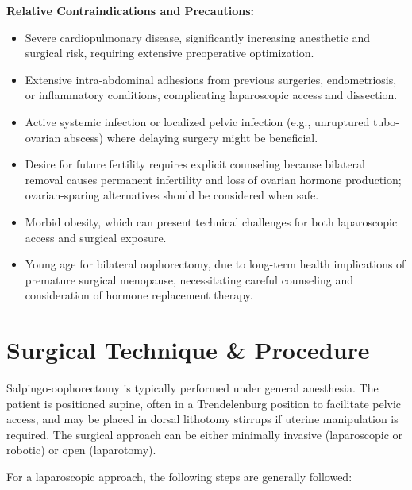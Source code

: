 \textbf{Relative Contraindications and Precautions:}
\begin{itemize}
  \item Severe cardiopulmonary disease, significantly increasing anesthetic and surgical risk, requiring extensive preoperative optimization.
  \item Extensive intra-abdominal adhesions from previous surgeries, endometriosis, or inflammatory conditions, complicating laparoscopic access and dissection.
  \item Active systemic infection or localized pelvic infection (e.g., unruptured tubo-ovarian abscess) where delaying surgery might be beneficial.
  \item Desire for future fertility requires explicit counseling because bilateral removal causes permanent infertility and loss of ovarian hormone production; ovarian-sparing alternatives should be considered when safe.
  \item Morbid obesity, which can present technical challenges for both laparoscopic access and surgical exposure.
  \item Young age for bilateral oophorectomy, due to long-term health implications of premature surgical menopause, necessitating careful counseling and consideration of hormone replacement therapy.
\end{itemize}

\section*{Surgical Technique \& Procedure}
Salpingo-oophorectomy is typically performed under general anesthesia. The patient is positioned supine, often in a Trendelenburg position to facilitate pelvic access, and may be placed in dorsal lithotomy stirrups if uterine manipulation is required. The surgical approach can be either minimally invasive (laparoscopic or robotic) or open (laparotomy).

For a laparoscopic approach, the following steps are generally followed:

